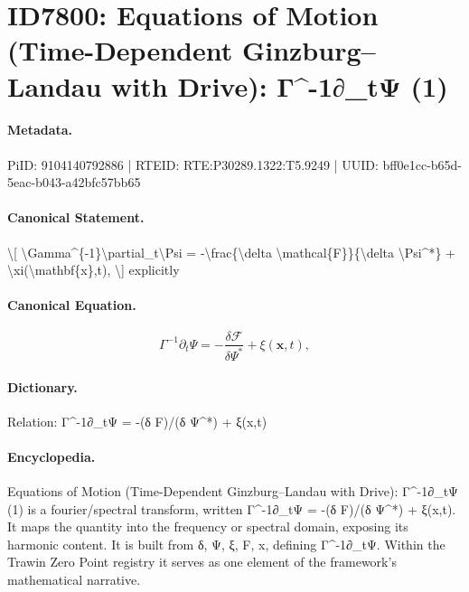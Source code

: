 \section*{ID7800: Equations of Motion (Time-Dependent Ginzburg–Landau with Drive): Γ\textasciicircum{}-1∂\_tΨ (1)}
\paragraph{Metadata.}
PiID: 9104140792886 | RTEID: RTE:P30289.1322:T5.9249 | UUID: bff0e1cc-b65d-5eac-b043-a42bfc57bb65

\paragraph{Canonical Statement.}
\textbackslash{}[ \textbackslash{}Gamma\textasciicircum{}\{-1\}\textbackslash{}partial\_t\textbackslash{}Psi = -\textbackslash{}frac\{\textbackslash{}delta \textbackslash{}mathcal\{F\}\}\{\textbackslash{}delta \textbackslash{}Psi\textasciicircum{}*\} + \textbackslash{}xi(\textbackslash{}mathbf\{x\},t), \textbackslash{}] explicitly

\paragraph{Canonical Equation.}
\[
\Gamma^{-1}\partial_t\Psi = -\frac{\delta \mathcal{F}}{\delta \Psi^*} + \xi(\mathbf{x},t),
\]

\paragraph{Dictionary.}
Relation: Γ\textasciicircum{}-1∂\_tΨ = -(δ F)/(δ Ψ\textasciicircum{}*) + ξ(x,t)

\paragraph{Encyclopedia.}
Equations of Motion (Time-Dependent Ginzburg–Landau with Drive): Γ\textasciicircum{}-1∂\_tΨ (1) is a fourier/spectral transform, written Γ\textasciicircum{}-1∂\_tΨ = -(δ F)/(δ Ψ\textasciicircum{}*) + ξ(x,t). It maps the quantity into the frequency or spectral domain, exposing its harmonic content. It is built from δ, Ψ, ξ, F, x, defining Γ\textasciicircum{}-1∂\_tΨ. Within the Trawin Zero Point registry it serves as one element of the framework's mathematical narrative.
